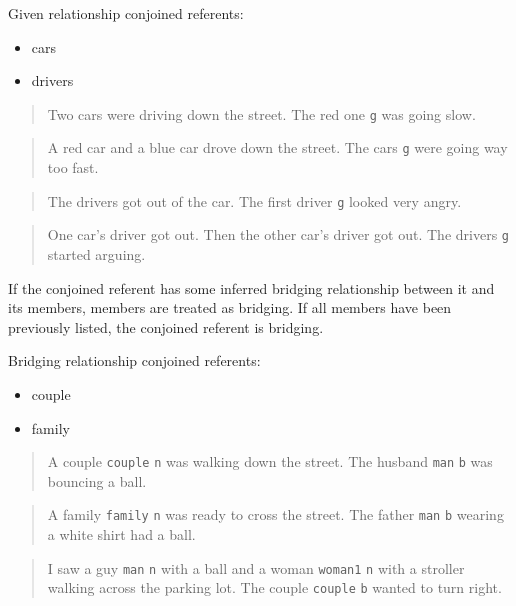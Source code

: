 \documentclass[
]{book}
\providecommand{\tightlist}{%
  \setlength{\itemsep}{0pt}\setlength{\parskip}{0pt}}
\begin{document}
Given relationship conjoined referents:

\begin{itemize}
\tightlist
\item
  cars
\item
  drivers
\end{itemize}

\begin{quote}
Two cars were driving down the street.
The red one \texttt{g} was going slow.
\end{quote}

\begin{quote}
A red car and a blue car drove down the street.
The cars \texttt{g} were going way too fast.
\end{quote}

\begin{quote}
The drivers got out of the car.
The first driver \texttt{g} looked very angry.
\end{quote}

\begin{quote}
One car's driver got out.
Then the other car's driver got out.
The drivers \texttt{g} started arguing.
\end{quote}

If the conjoined referent has some inferred bridging relationship between it and its members, members are treated as bridging.
If all members have been previously listed, the conjoined referent is bridging.

Bridging relationship conjoined referents:

\begin{itemize}
\tightlist
\item
  couple
\item
  family
\end{itemize}

\begin{quote}
A couple \texttt{couple} \texttt{n} was walking down the street.
The husband \texttt{man} \texttt{b} was bouncing a ball.
\end{quote}

\begin{quote}
A family \texttt{family} \texttt{n} was ready to cross the street.
The father \texttt{man} \texttt{b} wearing a white shirt had a ball.
\end{quote}

\begin{quote}
I saw a guy \texttt{man} \texttt{n} with a ball and a woman \texttt{woman1} \texttt{n} with a stroller walking across the parking lot.
The couple \texttt{couple} \texttt{b} wanted to turn right.
\end{quote}
\end{document}
